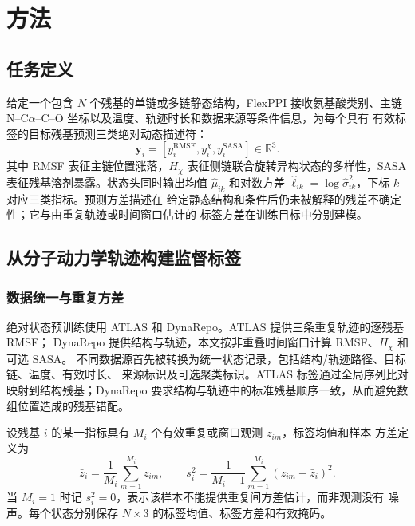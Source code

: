 
\section{方法}

\subsection{任务定义}

给定一个包含 $N$ 个残基的单链或多链静态结构，FlexPPI 接收氨基酸类别、主链
N--C$\alpha$--C--O 坐标以及温度、轨迹时长和数据来源等条件信息，为每个具有
有效标签的目标残基预测三类绝对动态描述符：
\begin{equation}
    \mathbf{y}_i=
    \left[y_i^{\mathrm{RMSF}},y_i^{\chi},y_i^{\mathrm{SASA}}\right]
    \in\mathbb{R}^{3}.
    \label{eq:absolute-state-target}
\end{equation}
其中 RMSF 表征主链位置涨落，$H_\chi$ 表征侧链联合旋转异构状态的多样性，SASA
表征残基溶剂暴露。状态头同时输出均值 $\hat\mu_{ik}$ 和对数方差
$\hat\ell_{ik}=\log\hat\sigma_{ik}^{2}$，下标 $k$ 对应三类指标。预测方差描述在
给定静态结构和条件后仍未被解释的残差不确定性；它与由重复轨迹或时间窗口估计的
标签方差在训练目标中分别建模。

\subsection{从分子动力学轨迹构建监督标签}

\subsubsection{数据统一与重复方差}

绝对状态预训练使用 ATLAS\cite{vandermeersche2024atlas} 和
DynaRepo\cite{mokhtari2026dynarepo}。ATLAS 提供三条重复轨迹的逐残基 RMSF；
DynaRepo 提供结构与轨迹，本文按非重叠时间窗口计算 RMSF、$H_\chi$ 和可选 SASA。
不同数据源首先被转换为统一状态记录，包括结构/轨迹路径、目标链、温度、有效时长、
来源标识及可选聚类标识。ATLAS 标签通过全局序列比对映射到结构残基；DynaRepo
要求结构与轨迹中的标准残基顺序一致，从而避免数组位置造成的残基错配。

设残基 $i$ 的某一指标具有 $M_i$ 个有效重复或窗口观测 $z_{im}$，标签均值和样本
方差定义为
\begin{equation}
    \bar z_i=\frac{1}{M_i}\sum_{m=1}^{M_i}z_{im},\qquad
    s_i^2=\frac{1}{M_i-1}\sum_{m=1}^{M_i}(z_{im}-\bar z_i)^2.
    \label{eq:label-mean-variance}
\end{equation}
当 $M_i=1$ 时记 $s_i^2=0$，表示该样本不能提供重复间方差估计，而非观测没有
噪声。每个状态分别保存 $N\times3$ 的标签均值、标签方差和有效掩码。

